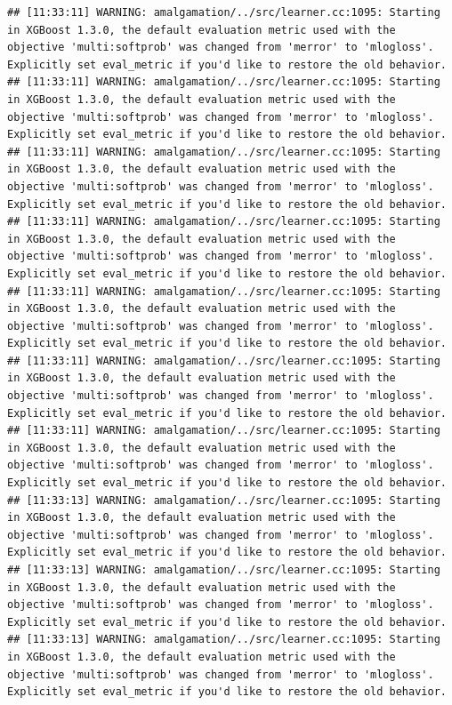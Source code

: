 \documentclass[
]{scrbook}
\begin{document}
\begin{verbatim}
## [11:33:11] WARNING: amalgamation/../src/learner.cc:1095: Starting in XGBoost 1.3.0, the default evaluation metric used with the objective 'multi:softprob' was changed from 'merror' to 'mlogloss'. Explicitly set eval_metric if you'd like to restore the old behavior.
## [11:33:11] WARNING: amalgamation/../src/learner.cc:1095: Starting in XGBoost 1.3.0, the default evaluation metric used with the objective 'multi:softprob' was changed from 'merror' to 'mlogloss'. Explicitly set eval_metric if you'd like to restore the old behavior.
## [11:33:11] WARNING: amalgamation/../src/learner.cc:1095: Starting in XGBoost 1.3.0, the default evaluation metric used with the objective 'multi:softprob' was changed from 'merror' to 'mlogloss'. Explicitly set eval_metric if you'd like to restore the old behavior.
## [11:33:11] WARNING: amalgamation/../src/learner.cc:1095: Starting in XGBoost 1.3.0, the default evaluation metric used with the objective 'multi:softprob' was changed from 'merror' to 'mlogloss'. Explicitly set eval_metric if you'd like to restore the old behavior.
## [11:33:11] WARNING: amalgamation/../src/learner.cc:1095: Starting in XGBoost 1.3.0, the default evaluation metric used with the objective 'multi:softprob' was changed from 'merror' to 'mlogloss'. Explicitly set eval_metric if you'd like to restore the old behavior.
## [11:33:11] WARNING: amalgamation/../src/learner.cc:1095: Starting in XGBoost 1.3.0, the default evaluation metric used with the objective 'multi:softprob' was changed from 'merror' to 'mlogloss'. Explicitly set eval_metric if you'd like to restore the old behavior.
## [11:33:11] WARNING: amalgamation/../src/learner.cc:1095: Starting in XGBoost 1.3.0, the default evaluation metric used with the objective 'multi:softprob' was changed from 'merror' to 'mlogloss'. Explicitly set eval_metric if you'd like to restore the old behavior.
## [11:33:13] WARNING: amalgamation/../src/learner.cc:1095: Starting in XGBoost 1.3.0, the default evaluation metric used with the objective 'multi:softprob' was changed from 'merror' to 'mlogloss'. Explicitly set eval_metric if you'd like to restore the old behavior.
## [11:33:13] WARNING: amalgamation/../src/learner.cc:1095: Starting in XGBoost 1.3.0, the default evaluation metric used with the objective 'multi:softprob' was changed from 'merror' to 'mlogloss'. Explicitly set eval_metric if you'd like to restore the old behavior.
## [11:33:13] WARNING: amalgamation/../src/learner.cc:1095: Starting in XGBoost 1.3.0, the default evaluation metric used with the objective 'multi:softprob' was changed from 'merror' to 'mlogloss'. Explicitly set eval_metric if you'd like to restore the old behavior.

\end{verbatim}
\end{document}
